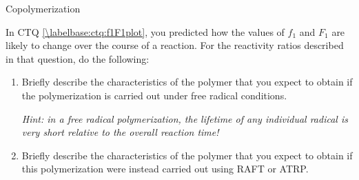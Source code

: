 \begin{activity}{Copolymerization}
\begin{exercises}
	\exercise In CTQ \ref{\labelbase:ctq:f1F1plot}, you predicted how the values of $f_1$ and $F_1$ are likely to change over the course of a reaction.  For the reactivity ratios described in that question, do the following: \label{\labelbase:exc:compshift}
	
		\begin{enumerate}
			\item Briefly describe the characteristics of the polymer that you expect to obtain if the polymerization is carried out under free radical conditions.
			
				\emph{Hint: in a free radical polymerization, the lifetime of any individual radical is very short relative to the overall reaction time!}
			
				\begin{solution}\end{solution}
				
			\item Briefly describe the characteristics of the polymer that you expect to obtain if this polymerization were instead carried out using RAFT or ATRP.
			
				\begin{solution}\end{solution}
				
		\end{enumerate}
	
	
\end{exercises}


%
%	


	
\end{activity}